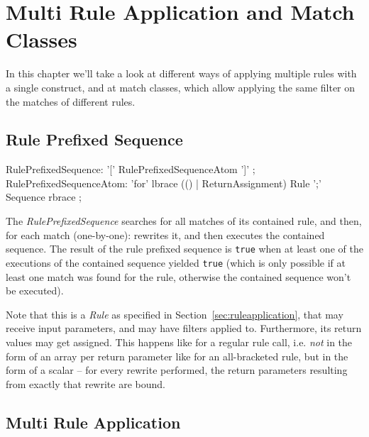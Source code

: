 \chapter{Multi Rule Application and Match Classes}
\label{cha:multiruleseq}

In this chapter we'll take a look at different ways of applying multiple rules with a single construct, and at match classes, which allow applying the same filter on the matches of different rules.

\section{Rule Prefixed Sequence}\label{sec:ruleprefixedsequence}

\begin{rail}
  RulePrefixedSequence: '[' RulePrefixedSequenceAtom ']' ;
  RulePrefixedSequenceAtom: 'for' lbrace (() | ReturnAssignment) Rule ';' Sequence rbrace ;
\end{rail}

The \emph{RulePrefixedSequence} searches for all matches of its contained rule, and then, for each match (one-by-one): rewrites it, and then executes the contained sequence.
The result of the rule prefixed sequence is \texttt{true} when at least one of the executions of the contained sequence  yielded \texttt{true} (which is only possible if at least one match was found for the rule, otherwise the contained sequence won't be executed).

Note that this is a \emph{Rule} as specified in Section~\ref{sec:ruleapplication}, that may receive input parameters, and may have filters applied to.
Furthermore, its return values may get assigned.
This happens like for a regular rule call, i.e. \emph{not} in the form of an array per return parameter like for an all-bracketed rule, but in the form of a scalar -- for every rewrite performed, the return parameters resulting from exactly that rewrite are bound.


\section{Multi Rule Application} \label{sec:multiruleapplication}


